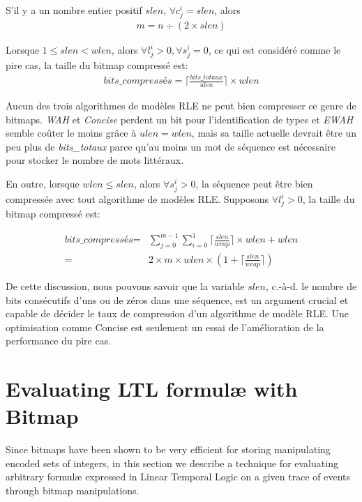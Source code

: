 S'il y a un nombre entier positif $slen$, $\forall c^i_j = slen$, alors
\begin{align}
m = n \div (2 \times slen) \label{eq:seqnum}
\end{align}

Lorsque $1 \leq slen < wlen$, alors $\forall l^i_j > 0, \forall s^i_j = 0$, ce qui est considéré comme le pire cas, la taille du bitmap compressé est:
\begin{align*}
\textit{bits\_compressés} = \lceil \frac{\textit{bits\_totaux}}{ulen} \rceil \times wlen 
\end{align*}

Aucun des trois algorithmes de modèles RLE ne peut bien compresser ce genre de bitmaps. \emph{WAH} et \emph{Concise} perdent un bit pour l'identification de types et \emph{EWAH} semble coûter le moins grâce à $ulen = wlen$, mais sa taille actuelle devrait être un peu plus de \textit{bits\_totaux} parce qu'au moins un mot de séquence est nécessaire pour stocker le nombre de mots littéraux.

En outre, lorsque $wlen \leq slen$, alors $\forall s^i_j > 0$, la séquence peut être bien compressée avec tout algorithme de modèles RLE. Supposons $\forall l^i_j > 0$, la taille du bitmap compressé est:

\begin{align*}
\textit{bits\_compressés} = &\sum_{j = 0}^{m - 1} \sum_{i = 0}^1 \lceil \frac{slen}{wcap} \rceil \times wlen + wlen \\
= & 2 \times m \times wlen \times (1 + \lceil \frac{slen}{wcap} \rceil)
\end{align*}

De cette discussion, nous pouvons savoir que la variable $slen$, c.-à-d. le nombre de bits consécutifs d'uns ou de zéros dans une séquence, est un argument crucial et capable de décider le taux de compression d'un algorithme de modèle RLE. Une optimisation comme Concise est seulement un essai de l'amélioration de la performance du pire cas.


\section{Evaluating LTL formul\ae{} with Bitmap}\label{sec:bm:ltlbitmap} %

Since bitmaps have been shown to be very efficient for storing manipulating encoded sets of integers, in this section we describe a technique for evaluating arbitrary formul\ae{} expressed in Linear Temporal Logic on a given trace of events through bitmap manipulations.

